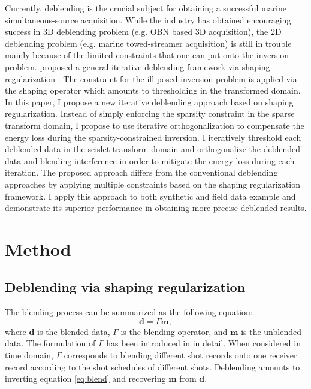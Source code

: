 Currently, deblending is the crucial subject for obtaining a successful marine simultaneous-source acquisition. While the industry has obtained encouraging success in 3D deblending problem (e.g. OBN based 3D acquisition), the 2D deblending problem (e.g. marine towed-streamer acquisition) is still in trouble mainly because of the limited constraints that one can put onto the inversion problem.  \cite{yangkang20142} proposed a general iterative deblending framework via shaping regularization \cite{fomel2007shape}. The constraint for the ill-posed inversion problem is applied via the shaping operator which amounts to thresholding in the transformed domain. In this paper, I propose a new iterative deblending approach based on shaping regularization. Instead of simply enforcing the sparsity constraint in the sparse transform domain, I propose to use iterative orthogonalization to compensate the energy loss during the sparsity-constrained inversion. I iteratively threshold each deblended data in the seislet transform domain \cite{seislet}  and orthogonalize the deblended data and blending interference in order to mitigate the energy loss during each iteration. The proposed approach differs from the conventional deblending approaches by applying multiple constraints based on the shaping regularization framework.  I apply this approach to both synthetic and field data example and demonstrate its superior performance in obtaining more precise deblended results.%

\section{Method}
\subsection{Deblending via shaping regularization}
The blending process can be summarized as the following equation: 
\begin{equation}
\label{eq:blend}
\mathbf{d}=\Gamma\mathbf{m},
\end{equation}
where $\mathbf{d}$ is the blended data, $\Gamma$ is the blending operator, and $\mathbf{m}$ is the unblended data.
The formulation of $\Gamma$ has been introduced in \cite{arazthesis} in detail. When considered in time domain, $\Gamma$ corresponds to blending different shot records onto one receiver record according to the shot schedules of different shots. Deblending amounts to inverting equation \ref{eq:blend} and recovering $\mathbf{m}$ from $\mathbf{d}$.

